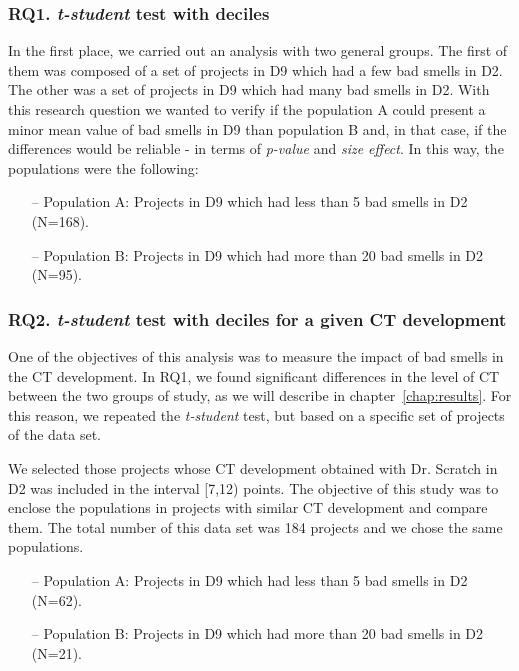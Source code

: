 \subsubsection{RQ1. \textit{t-student} test with deciles}
\label{subsubsec:rq1_t_student_deciles}

In the first place, we carried out an analysis with two general groups. The first of them was composed of a set of projects in D9 which had a few bad smells in D2. The other was a set of projects in D9 which had many bad smells in D2. With this research question we wanted to verify if the population A could present a minor mean value of bad smells in D9 than population B and, in that case, if the differences would be reliable - in terms of \textit{p-value} and \textit{size effect}. In this way, the populations were the following:

\begin{itemize}
    \item[--] Population A: Projects in D9 which had less than 5 bad smells in D2 (N=168).
    \item[--] Population B: Projects in D9 which had more than 20 bad smells in D2 (N=95).
\end{itemize}


\subsubsection{RQ2. \textit{t-student} test with deciles for a given CT development}
\label{subsubsec:rq2_t_student_deciles_ct}

One of the objectives of this analysis was to measure the impact of bad smells in the CT development. In RQ1, we found significant differences in the level of CT between the two groups of study, as we will describe in chapter~\ref{chap:results}. For this reason, we repeated the \textit{t-student} test, but based on a specific set of projects of the data set. 

We selected those projects whose CT development obtained with Dr. Scratch in D2 was included in the interval [7,12) points. The objective of this study was to enclose the populations in projects with similar CT development and compare them. The total number of this data set was 184 projects and we chose the same populations.

\begin{itemize}
    \item[--] Population A: Projects in D9 which had less than 5 bad smells in D2 (N=62).
    \item[--] Population B: Projects in D9 which had more than 20 bad smells in D2 (N=21).
\end{itemize}


